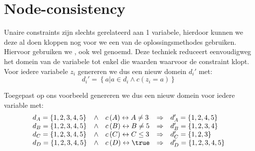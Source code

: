 \section{Node-consistency}
Unaire constraints zijn slechts gerelateerd aan 1 variabele, hierdoor kunnen we deze al doen kloppen nog voor we een van de oplossingsmethodes gebruiken. Hiervoor gebruiken we , ook wel  genoemd. Deze techniek reduceert eenvoudigweg het domein van de variabele tot enkel die waarden waarvoor de constraint klopt. Voor iedere variabele $z_i$ genereren we dus een nieuw domein $d_i'$ met:
\begin{equation}
d_i'=\left\{a|a\in d_i\wedge c\left(z_i=a\right)\right\}
\end{equation}
\begin{leftbar}
Toegepast op ons voorbeeld genereren we dus een nieuw domein voor iedere variable met:
\begin{equation}
\begin{array}{lclcl}
d_A=\left\{1,2,3,4,5\right\}&\wedge&c\left(A\right)\leftrightarrow A\neq 3&\Rightarrow&d_A'=\left\{1,2,4,5\right\}\\
d_B=\left\{1,2,3,4,5\right\}&\wedge&c\left(B\right)\leftrightarrow B\neq 5&\Rightarrow&d_B'=\left\{1,2,3,4\right\}\\
d_C=\left\{1,2,3,4,5\right\}&\wedge&c\left(C\right)\leftrightarrow C\leq 3&\Rightarrow&d_C'=\left\{1,2,3\right\}\\
d_D=\left\{1,2,3,4,5\right\}&\wedge&c\left(D\right)\leftrightarrow\true&\Rightarrow&d_D'=\left\{1,2,3,4,5\right\}
\end{array}
\end{equation}
\end{leftbar}
